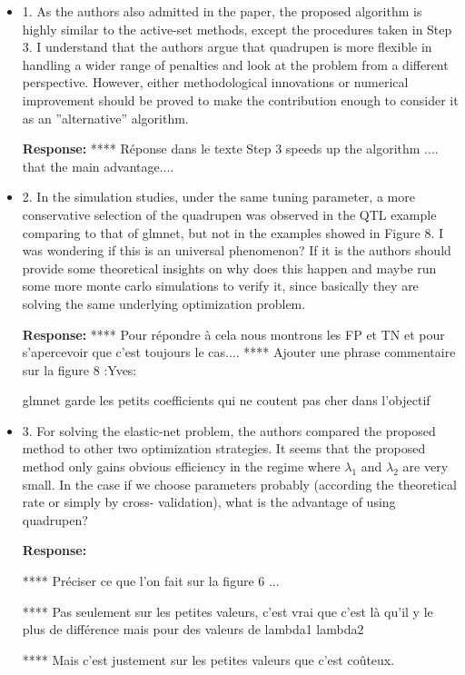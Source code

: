 \documentclass[a4paper,11pt]{texMemo}
\newenvironment{comment}
{
   \par\medskip \color{black}%
   \textbf{Response: }}
{\medskip}
\newenvironment{remark}
{\begin{itshape} \color{gray}}
{\end{itshape}}
\begin{document}
\begin{itemize}
\item

  \begin{remark}
    1. As the authors also admitted in the paper, the proposed
    algorithm is highly similar to the active-set methods, except the
    procedures taken in Step 3. I understand that the authors argue
    that quadrupen is more flexible in handling a wider range of
    penalties and look at the problem from a different
    perspective. However, either methodological innovations or
    numerical improvement should be proved to make the contribution
    enough to consider it as an ”alternative” algorithm.
\end{remark}
\begin{comment}
**** Réponse dans le texte 
Step 3 speeds up the algorithm .... that the main advantage....
\end{comment}


\item
  \begin{remark}
    2. In the simulation studies, under the same tuning parameter, a
    more conservative selection of the quadrupen was observed in the
    QTL example comparing to that of glmnet, but not in the examples
    showed in Figure 8. I was wondering if this is an universal
    phenomenon? If it is the authors should provide some theoretical
    insights on why does this happen and maybe run some more monte
    carlo simulations to verify it, since basically they are solving
    the same underlying optimization problem.
\end{remark}

\begin{comment}
**** Pour répondre à cela nous montrons les FP et TN et pour s'apercevoir que c'est toujours le cas....
**** Ajouter une phrase commentaire sur la figure 8   :Yves:

glmnet garde les petits coefficients qui ne coutent pas cher dans l'objectif
\end{comment}
\item 
  \begin{remark}
    3. For solving the elastic-net problem, the authors compared the
    proposed method to other two optimization strategies. It seems
    that the proposed method only gains obvious efficiency in the
    regime where $\lambda_1$ and $\lambda_2$ are very small.
    In the case if we choose
    parameters probably (according the theoretical rate or simply by
    cross- validation), what is the advantage of using quadrupen?
\end{remark}


\begin{comment}

  **** Préciser ce que l'on fait sur la figure 6 ... 

**** Pas seulement sur les petites valeurs,
c'est vrai que c'est là qu'il y
le plus de différence mais pour
des valeurs de lambda1 lambda2


**** Mais c'est justement 
sur les petites valeurs que c'est coûteux.

\end{comment}
\end{itemize}
\end{document}
